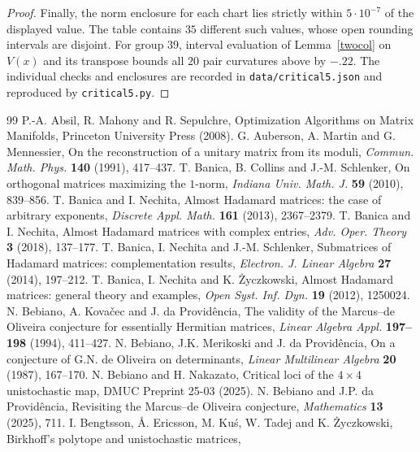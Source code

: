 \documentclass[11pt,a4paper]{article}
\begin{document}
\begin{proof}
Finally, the norm enclosure for each chart lies strictly within
$5\cdot10^{-7}$ of the displayed value. The table contains $35$
different such values, whose open rounding intervals are disjoint.
For group $39$, interval evaluation of Lemma~\ref{twocol} on $V(x)$
and its transpose bounds all $20$ pair curvatures above by $-.22$.
The individual checks and enclosures are recorded in
\texttt{data/critical5.json} and reproduced by \texttt{critical5.py}.
\end{proof}

\begin{thebibliography}{99}
\setlength{\itemsep}{2pt}
\setlength{\parsep}{0pt}
 P.-A. Absil, R. Mahony and R. Sepulchre,
Optimization Algorithms on Matrix Manifolds, Princeton University
Press (2008).
 G. Auberson, A. Martin and G. Mennessier,
On the reconstruction of a unitary matrix from its moduli,
\emph{Commun. Math. Phys.} \textbf{140} (1991), 417--437.
 T. Banica, B. Collins and J.-M. Schlenker,
On orthogonal matrices maximizing the $1$-norm,
\emph{Indiana Univ. Math. J.} \textbf{59} (2010), 839--856.
 T. Banica and I. Nechita, Almost Hadamard matrices:
the case of arbitrary exponents, \emph{Discrete Appl. Math.}
\textbf{161} (2013), 2367--2379.
 T. Banica and I. Nechita, Almost Hadamard matrices with
complex entries, \emph{Adv. Oper. Theory} \textbf{3} (2018), 137--177.
 T. Banica, I. Nechita and J.-M. Schlenker,
Submatrices of Hadamard matrices: complementation results,
\emph{Electron. J. Linear Algebra} \textbf{27} (2014), 197--212.
 T. Banica, I. Nechita and K. \.Zyczkowski,
Almost Hadamard matrices: general theory and examples,
\emph{Open Syst. Inf. Dyn.} \textbf{19} (2012), 1250024.
 N. Bebiano, A. Kova\v{c}ec and J. da Provid\^encia,
The validity of the Marcus--de Oliveira conjecture for essentially
Hermitian matrices, \emph{Linear Algebra Appl.} \textbf{197--198}
(1994), 411--427.
 N. Bebiano, J.K. Merikoski and J. da Provid\^encia,
On a conjecture of G.N. de Oliveira on determinants,
\emph{Linear Multilinear Algebra} \textbf{20} (1987), 167--170.
 N. Bebiano and H. Nakazato, Critical loci of the $4\times4$
unistochastic map, DMUC Preprint 25-03 (2025).
 N. Bebiano and J.P. da Provid\^encia,
Revisiting the Marcus--de Oliveira conjecture,
\emph{Mathematics} \textbf{13} (2025), 711.
 I. Bengtsson, \AA. Ericsson, M. Ku\'s, W. Tadej and
K. \.Zyczkowski, Birkhoff's polytope and unistochastic matrices,

\end{thebibliography}
\end{document}
